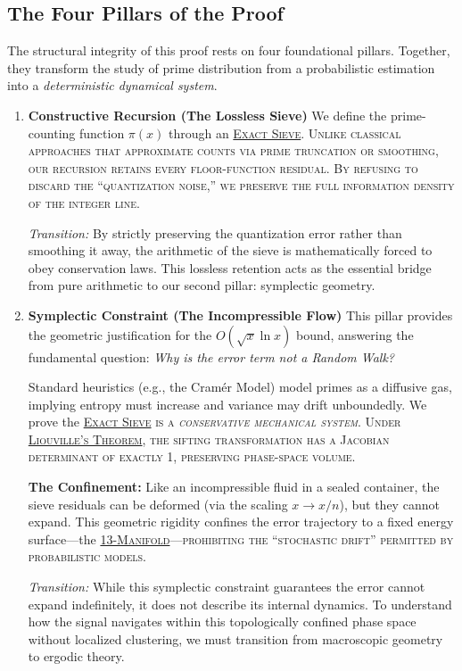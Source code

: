 \documentclass[sn-mathphys-num, pdflatex, referee]{sn-jnl}
\newcommand{\gterm}[2]{\begingroup\normalfont\scshape\hyperlink{#1}{#2}\endgroup}
\begin{document}
\subsection{The Four Pillars of the Proof}
The structural integrity of this proof rests on four foundational pillars. Together, they transform the study of prime distribution from a probabilistic estimation into a \textit{deterministic dynamical system}.

\begin{enumerate}
    \item \textbf{Constructive Recursion (The Lossless Sieve)}
    We define the prime-counting function $\pi(x)$ through an \gterm{exact_sieve}{Exact Sieve}. Unlike classical approaches that approximate counts via prime truncation or smoothing, our recursion retains every floor-function residual. By refusing to discard the ``quantization noise,'' we preserve the full information density of the integer line.
  
    \noindent\textit{Transition:} By strictly preserving the quantization error rather than smoothing it away, the arithmetic of the sieve is mathematically forced to obey conservation laws. This lossless retention acts as the essential bridge from pure arithmetic to our second pillar: symplectic geometry.
    
    \item \textbf{Symplectic Constraint (The Incompressible Flow)}
    This pillar provides the geometric justification for the $O(\sqrt{x}\ln x)$ bound, answering the fundamental question: \textit{Why is the error term not a Random Walk?}
    
    Standard heuristics (e.g., the Cramér Model) model primes as a diffusive gas, implying entropy must increase and variance may drift unboundedly. We prove the \gterm{exact_sieve}{Exact Sieve} is a \textit{conservative mechanical system}. Under \gterm{liouville}{Liouville's Theorem}, the sifting transformation has a Jacobian determinant of exactly 1, preserving phase-space volume.     
        
    \textbf{The Confinement:} Like an incompressible fluid in a sealed container, the sieve residuals can be deformed (via the scaling $x \to x/n$), but they cannot expand. This geometric rigidity confines the error trajectory to a fixed energy surface---the \gterm{m13}{13-Manifold}---prohibiting the ``stochastic drift'' permitted by probabilistic models.
   
    \noindent\textit{Transition:} While this symplectic constraint guarantees the error cannot expand indefinitely, it does not describe its internal dynamics. To understand how the signal navigates within this topologically confined phase space without localized clustering, we must transition from macroscopic geometry to ergodic theory.
    

\end{enumerate}
\end{document}
